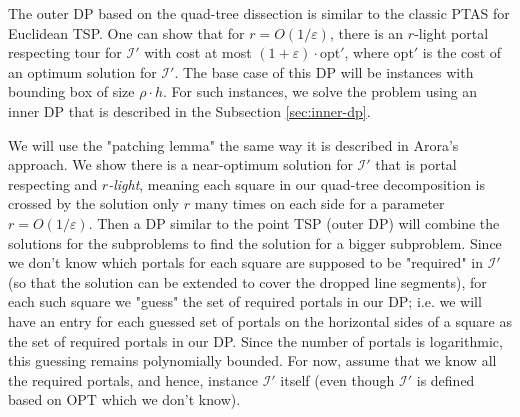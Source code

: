 \documentclass[10pt,a4paper]{amsart}
\theoremstyle{thmstyleone}
\newcommand{\eps}{\varepsilon}
\newcommand{\opt}{{\text{opt}}}
\newcommand{\OPT}{{\text{OPT}}}
\begin{document}
The outer DP based on the quad-tree dissection is similar to the classic PTAS for Euclidean TSP.
One can show that for $r=O(1/\eps)$, there is an $r$-light portal respecting tour for $\mathcal I'$ with cost
at most $(1+\eps)\cdot\opt'$, where $\opt'$ is the cost of an optimum solution for $\mathcal I'$. 
The base case of this DP will be instances with bounding box of size $\rho\cdot h$. For such instances,
we solve the problem using an inner DP that is described in the Subsection \ref{sec:inner-dp}.

We will use the "patching lemma" the same way it is described in Arora's approach. We show there is a near-optimum solution for $\mathcal I'$ that is
portal respecting and {\em $r$-light}, meaning each square in our quad-tree decomposition is crossed by the solution only $r$ many times on each side for a parameter $r=O(1/\eps)$. Then a DP similar to the point TSP (outer DP) will combine the solutions for the subproblems to find the solution for a bigger subproblem.
Since we don't know which portals for each square are supposed to be "required" in $\mathcal I'$ (so that the solution can be extended to cover the dropped line segments), for each such square we "guess" the set of required portals in our DP; i.e. we will have an entry for each guessed set of portals on the horizontal sides of a square as the set of required portals in our DP. Since the number of portals is logarithmic, this guessing remains polynomially bounded. For now, assume that we know all the required portals, and hence,
instance $\mathcal I'$ itself (even though $\mathcal I'$ is defined based on $\OPT$ which we don't know).
\end{document}

